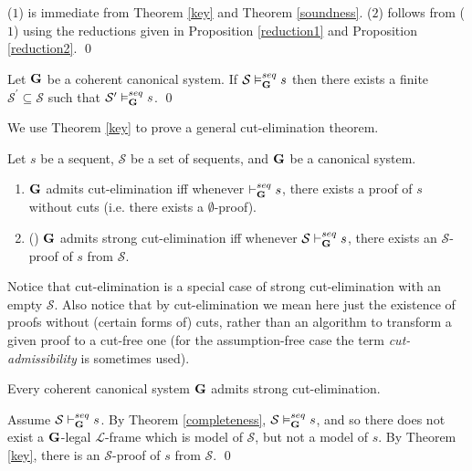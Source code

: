 \documentclass{LMCS}
\theoremstyle{remark}
\newcommand{\lp}{\mathcal{L}}
\newcommand{\Ss}{\mathcal{S}}
\newcommand{\G}{{\bf G}}
\newcommand{\be}{\begin{enumerate}[(1)]}
\newcommand{\ee}{\end{enumerate}}
\newcommand{\vd}{\vdash}
\newcommand{\vD}{\vDash}
\newcommand{\suq}{\subseteq}
\begin{document}
\begin{enumerate}[(a)]
\begin{enumerate}[\bf(a):]
\fussy
\proof
($1$) is immediate from Theorem \ref{key} and Theorem \ref{soundness}.
($2$) follows from ($1$) using the reductions given 
in Proposition \ref{reduction1} and Proposition \ref{reduction2}.
\qed

\begin{cor}[Compactness]
Let ${\G}$ be a coherent canonical system.
If $\Ss\vD^{seq}_{{\G}}s$ 
then there exists a finite $\Ss^{\prime}\suq\Ss$ such that 
$\Ss^{\prime}\vD^{seq}_{{\G}}s$.
\qed
\end{cor}

We use Theorem \ref{key} to prove a general cut-elimination theorem.

\begin{defi}
\label{cut elimination}
Let $s$ be a sequent, ${\Ss}$ be a set of sequents,
and ${\G}$ be a canonical system.
\be
\item ${\G}$ admits cut-elimination iff whenever ${\vd_\G^{seq}s}$, there exists
a proof of ${s}$ without cuts (i.e. there exists a $\emptyset$-proof).
\item (\cite{Av93}) ${\G}$ admits strong
cut-elimination iff whenever  ${\Ss\vd_\G^{seq}s}$, there exists
an $\Ss$-proof of ${s}$ from $\Ss$.
\ee
\end{defi}

Notice that cut-elimination is a special case of strong cut-elimination with an empty $\Ss$.
Also notice that by cut-elimination we mean here just the existence of proofs without (certain forms
of) cuts, rather than an algorithm to transform a given proof to a cut-free one (for
the assumption-free case the term {\em cut-admissibility} is sometimes used).

\begin{thm}
\label{cut-elimination}
Every coherent canonical system ${\G}$
admits strong cut-elimination.
\end{thm}
\proof
Assume ${\Ss\vd_\G^{seq}s}$.
By  Theorem \ref{completeness}, ${\Ss\vD_\G^{seq}s}$,
and so there does not exist a ${\G}$-legal $\lp$-frame 
which is model of $\Ss$, but not a model of $s$.
By Theorem \ref{key}, there is an $\Ss$-proof of $s$ from $\Ss$.
\qed


\end{enumerate}
\end{enumerate}
\end{document}
